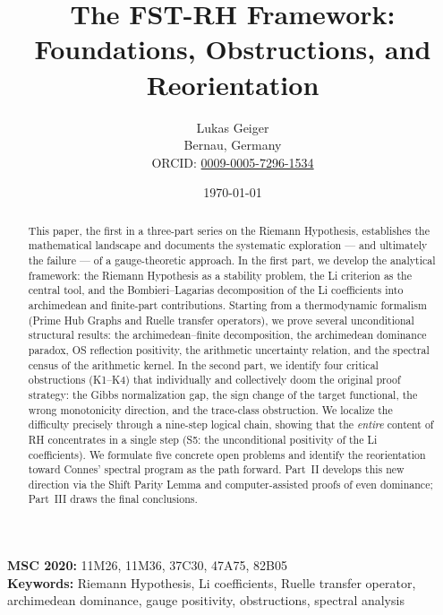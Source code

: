 \documentclass[12pt,a4paper]{article}
\title{The FST-RH Framework:\\
Foundations, Obstructions, and Reorientation}
\author{Lukas Geiger\\
\small Bernau, Germany\\
\small ORCID: \href{https://orcid.org/0009-0005-7296-1534}{0009-0005-7296-1534}}
\date{\today}
\theoremstyle{definition}
\theoremstyle{remark}
\begin{document}
\maketitle

\begin{abstract}
This paper, the first in a three-part series on the Riemann Hypothesis, establishes the mathematical landscape and documents the systematic exploration --- and ultimately the failure --- of a gauge-theoretic approach. In the first part, we develop the analytical framework: the Riemann Hypothesis as a stability problem, the Li criterion as the central tool, and the Bombieri--Lagarias decomposition of the Li coefficients into archimedean and finite-part contributions. Starting from a thermodynamic formalism (Prime Hub Graphs and Ruelle transfer operators), we prove several unconditional structural results: the archimedean--finite decomposition, the archimedean dominance paradox, OS reflection positivity, the arithmetic uncertainty relation, and the spectral census of the arithmetic kernel. In the second part, we identify four critical obstructions (K1--K4) that individually and collectively doom the original proof strategy: the Gibbs normalization gap, the sign change of the target functional, the wrong monotonicity direction, and the trace-class obstruction. We localize the difficulty precisely through a nine-step logical chain, showing that the \emph{entire} content of RH concentrates in a single step (S5: the unconditional positivity of the Li coefficients). We formulate five concrete open problems and identify the reorientation toward Connes' spectral program as the path forward. Part~II develops this new direction via the Shift Parity Lemma and computer-assisted proofs of even dominance; Part~III draws the final conclusions.
\end{abstract}

\noindent\textbf{MSC 2020:} 11M26, 11M36, 37C30, 47A75, 82B05\\
\textbf{Keywords:} Riemann Hypothesis, Li coefficients, Ruelle transfer operator, archimedean dominance, gauge positivity, obstructions, spectral analysis

\tableofcontents


\end{document}
